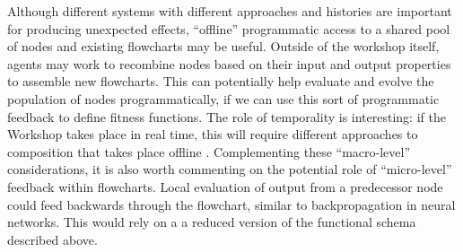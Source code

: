 Although different systems with different approaches and histories are
important for producing unexpected effects, ``offline'' programmatic
access to a shared pool of nodes and existing flowcharts may be
useful.  Outside of the workshop itself, agents may work to recombine
nodes based on their input and output properties to assemble new
flowcharts.  This can potentially help evaluate and evolve the
population of nodes programmatically, if we can use this sort of
programmatic feedback to define fitness functions.  The role of
temporality is interesting: if the Workshop takes place in real time,
this will require different approaches to composition that takes place
offline \cite{perez2013rolling}.
%
Complementing these ``macro-level'' considerations, it is also worth
commenting on the potential role of ``micro-level'' feedback within
flowcharts.  Local evaluation of output from a predecessor node could
feed backwards through the flowchart, similar to backpropagation in
neural networks.  This would rely on a a reduced version of the
functional schema described above.
